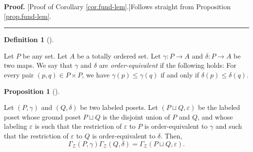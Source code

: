 \documentclass[numbers=enddot,12pt,final,onecolumn,notitlepage]{scrartcl}%
\theoremstyle{definition}
\newtheorem{prop}[theo]{Proposition}
\newenvironment{proposition}[1][]
{\begin{prop}[#1]\begin{leftbar}}
{\end{leftbar}\end{prop}}
\newtheorem{defi}[theo]{Definition}
\newenvironment{definition}[1][]
{\begin{defi}[#1]\begin{leftbar}}
{\end{leftbar}\end{defi}}
\newenvironment{proof}[1][Proof]{\noindent\textbf{#1.} }{\ \rule{0.5em}{0.5em}}
\begin{document}
\begin{proof}
[Proof of Corollary \ref{cor.fund-lem}.]Follows straight from Proposition
\ref{prop.fund-lem}.
\end{proof}

\begin{definition}
Let $P$ be any set. Let $A$ be a totally ordered set. Let $\gamma:P\rightarrow
A$ and $\delta:P\rightarrow A$ be two maps. We say that $\gamma$ and $\delta$
are \textit{order-equivalent} if the following holds: For every pair $\left(
p,q\right)  \in P\times P$, we have $\gamma\left(  p\right)  \leq\gamma\left(
q\right)  $ if and only if $\delta\left(  p\right)  \leq\delta\left(
q\right)  $.
\end{definition}

\begin{proposition}
\label{prop.prod1}Let $\left(  P,\gamma\right)  $ and $\left(  Q,\delta
\right)  $ be two labeled posets. Let $\left(  P\sqcup Q,\varepsilon\right)  $
be the labeled poset whose ground poset $P\sqcup Q$ is the disjoint union of
$P$ and $Q$, and whose labeling $\varepsilon$ is such that the restriction of
$\varepsilon$ to $P$ is order-equivalent to $\gamma$ and such that the
restriction of $\varepsilon$ to $Q$ is order-equivalent to $\delta$. Then,%
\[
\Gamma_{\mathcal{Z}}\left(  P,\gamma\right)  \Gamma_{\mathcal{Z}}\left(
Q,\delta\right)  =\Gamma_{\mathcal{Z}}\left(  P\sqcup Q,\varepsilon\right)  .
\]

\end{proposition}
\end{document}
